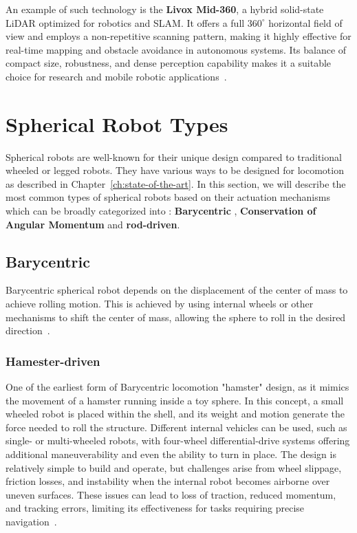 \documentclass[english, bachelor, utf8]{base/thesis_telematics}
\begin{document}
An example of such technology is the \textbf{Livox Mid-360}, a hybrid solid-state LiDAR optimized for robotics and SLAM. 
It offers a full \(360^\circ\) horizontal field of view and employs a non-repetitive scanning pattern, making it highly effective for real-time mapping and obstacle avoidance in autonomous systems. Its balance of compact size, robustness, and dense perception capability makes it a suitable choice for research and mobile robotic applications~\cite{livox_mid360_docs}.

\section{Spherical Robot Types}
\label{sec:spherical-robot-types}
Spherical robots are well-known for their unique design compared to traditional wheeled or legged robots.
They have various ways to be designed for locomotion as described in Chapter~\ref{ch:state-of-the-art}.
In this section, we will describe the most common types of spherical robots based on their actuation mechanisms which can be broadly categorized into : \textbf{Barycentric} , \textbf{Conservation of Angular Momentum} and \textbf{rod-driven}.
\subsection{Barycentric}
Barycentric spherical robot depends on the displacement of the center of mass to achieve rolling motion.
This is achieved by using internal wheels or other mechanisms to shift the center of mass, allowing the sphere to roll in the desired direction~\cite{Aminata}.
\subsubsection{Hamester-driven}
One of the earliest form of Barycentric locomotion "hamster" design, as it mimics the movement of a hamster running inside a toy sphere. 
In this concept, a small wheeled robot is placed within the shell, and its weight and motion generate the force needed to roll the structure. Different internal vehicles can be used, such as single- or multi-wheeled robots, with four-wheel differential-drive systems offering additional maneuverability and even the ability to turn in place. 
The design is relatively simple to build and operate, but challenges arise from wheel slippage, friction losses, and instability when the internal robot becomes airborne over uneven surfaces. 
These issues can lead to loss of traction, reduced momentum, and tracking errors, limiting its effectiveness for tasks requiring precise navigation~\cite{flywheel_hamaster_explanation}.
\end{document}
